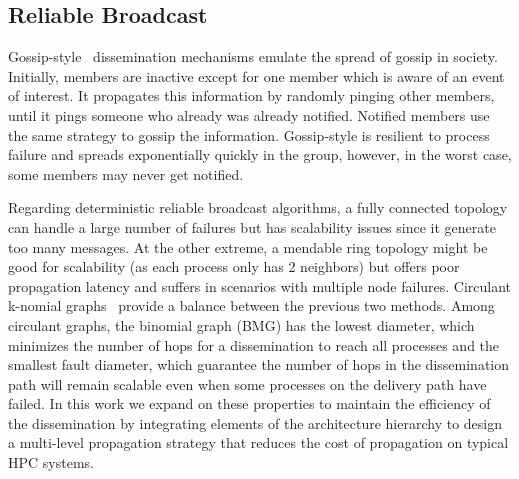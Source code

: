 \documentclass[5p,times,twocolumn]{elsarticle}
\begin{document}
\subsection{Reliable Broadcast}
%
%
Gossip-style~\cite{infection-style,Abhinandan02} dissemination mechanisms emulate the spread of gossip in society. Initially, members are inactive except for one member which is aware of an event of interest. It propagates this information by randomly pinging other members, until it pings someone who already was already notified. Notified members use the same strategy to gossip the information. Gossip-style is resilient to process failure and spreads exponentially quickly in the group, however, in the worst case, some members may never get notified.

Regarding deterministic reliable broadcast algorithms, a fully connected topology can handle a large number of failures but has scalability issues since it generate too many messages. At the other extreme, a mendable ring topology might be good for scalability (as each process only has 2 neighbors)
but offers poor propagation latency and suffers in scenarios with multiple node failures.
Circulant k-nomial graphs~\cite{Angskun07, Pava11} provide a balance between the previous two methods.
Among circulant graphs, the binomial graph (BMG) has the lowest diameter, which minimizes the number of hops for a dissemination to reach all
processes and the smallest fault diameter, which guarantee the number of hops in the dissemination path will remain scalable even when some processes on the delivery path have failed.
In this work we expand on these properties to maintain the efficiency of the dissemination by integrating elements of the
architecture hierarchy to design a multi-level propagation strategy that
reduces the cost of propagation on typical HPC systems.
\end{document}
